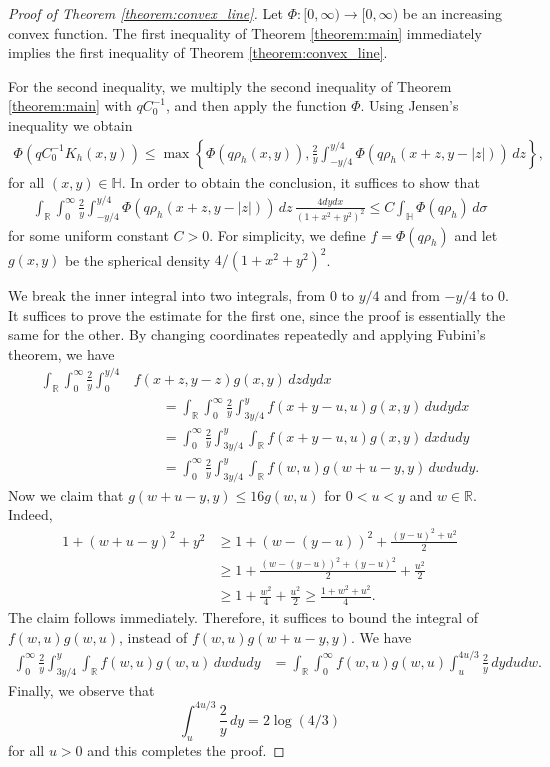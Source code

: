 \documentclass{amsart}
\theoremstyle{plain}
\theoremstyle{definition}
\theoremstyle{remark}
\numberwithin{equation}{section}
\numberwithin{theorem}{section}
\numberwithin{conjecture}{section}
\newcommand{\R}{\mathbb R}
\newcommand{\1}{\mathbf 1}
\newcommand{\UHP}{\mathbb H}
\begin{document}
\begin{proof}[Proof of Theorem \ref{theorem:convex_line}]

Let $\Phi\colon [0,\infty)\to [0,\infty)$ be an increasing convex function. The first inequality of Theorem \ref{theorem:main} immediately implies the first inequality of Theorem \ref{theorem:convex_line}.

For the second inequality, we multiply the second inequality of Theorem \ref{theorem:main} with $qC_0^{-1}$, and then apply the function $\Phi$. Using Jensen's inequality we obtain
\begin{align*}
\Phi(qC_0^{-1}K_h(x,y)) \leq  \max \left\{\Phi(q\rho_h(x,y)), \frac{2}{y}\int_{-y/4}^{y/4} \Phi(q\rho_h(x+z,y-|z|))\, dz \right\},
\end{align*}
for all $(x,y)\in \UHP$. In order to obtain the conclusion, it suffices to show that
\begin{align*}
\int_{\R} \int_{0}^{\infty} \frac{2}{y}\int_{-y/4}^{y/4} \Phi(q\rho_h(x+z,y-|z|)) \, dz \, \frac{4dydx}{(1+x^2+y^2)^2} \leq C  \int_{\UHP} \Phi(q\rho_h) \, d\sigma
\end{align*}
for some uniform constant $C>0$. For simplicity, we define $f=\Phi(q\rho_h)$ and let $g(x,y)$ be the spherical density $4/(1+x^2+y^2)^2$. 

We break the inner integral into two integrals, from $0$ to $y/4$ and from $-y/4$ to $0$. It suffices to prove the estimate for the first one, since the proof is essentially the same for the other. By changing coordinates repeatedly and applying Fubini's theorem, we have
\begin{align*}
\int_{\R} \int_{0}^{\infty} \frac{2}{y}\int_0^{y/4} &f(x+z,y-z)g(x,y) \, dzdydx\\
&\quad\quad= \int_{\R} \int_{0}^{\infty} \frac{2}{y}\int_{3y/4}^{y} f(x+y-u,u)g(x,y) \, dudydx\\
&\quad\quad= \int_{0}^{\infty} \frac{2}{y}\int_{3y/4}^{y} \int_{\R}f(x+y-u,u)g(x,y) \, dxdudy\\
&\quad\quad= \int_{0}^{\infty} \frac{2}{y}\int_{3y/4}^{y} \int_{\R}f(w,u)g(w+u-y,y) \, dwdudy.
\end{align*}
Now we claim that $g(w+u-y,y)\leq 16 g(w,u)$ for $0<u<y$ and $w\in \R$. Indeed,
\begin{align*}
1+(w+u-y)^2+y^2&\geq 1+(w-(y-u))^2 + \frac{(y-u)^2+u^2}{2} \\
&\geq 1+\frac{(w-(y-u))^2 +(y-u)^2}{2} +\frac{u^2}{2}\\
&\geq 1+ \frac{w^2}{4}+\frac{u^2}{2} \geq \frac{1+w^2+u^2}{4}.
\end{align*}
The claim follows immediately. Therefore, it suffices to bound the integral of $f(w,u)g(w,u)$, instead of $f(w,u)g(w+u-y,y)$. We have
\begin{align*}
\int_{0}^{\infty} \frac{2}{y}\int_{3y/4}^{y} \int_{\R}f(w,u)g(w,u) \, dwdudy&= \int_{\R}\int_{0}^\infty  f(w,u)g(w,u)\int_{u}^{4u/3} \frac{2}{y}\,dydudw.
\end{align*}
Finally, we observe that 
$$\int_{u}^{4u/3} \frac{2}{y}\,dy= 2\log(4/3)$$
for all $u>0$ and this completes the proof.
\end{proof}
\end{document}
